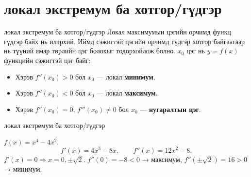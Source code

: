 \section{локал экстремум ба хотгор/гүдгэр}
\begin{frame}[allowframebreaks]{локал экстремум ба хотгор/гүдгэр}
Локал максимумын цэгийн орчимд функц гүдгэр байх нь илэрхий. Иймд сэжигтэй цэгийн орчимд гүдгэр хотгор байгаагаар нь түүний ямар төрлийн цэг болохыг тодорхойлож болно.  
$x_0$ цэг нь $y=f(x)$ функцийн сэжигтэй цэг байг:
\begin{itemize}
  \item Хэрэв $f''(x_0)>0$ бол $x_0$ — локал \textbf{минимум}.
  \item Хэрэв $f''(x_0)<0$ бол $x_0$ — локал \textbf{максимум}.
  \item Хэрэв $f''(x_0)=0$, $f'''(x_0)\ne0$ бол $x_0$ — \textbf{нугаралтын цэг}.
\end{itemize}
\end{frame}

\begin{frame}[allowframebreaks]{локал экстремум ба хотгор/гүдгэр}
\begin{example}
$f(x)=x^4-4x^2$.
\[
f'(x)=4x^3-8x,\qquad f''(x)=12x^2-8.
\]
$f'(x)=0\Rightarrow x=0,\pm\sqrt2$.  
$f''(0)=-8<0$ → максимум,  
$f''(\pm\sqrt2)=16>0$ → минимум.
\end{example}

\begin{center}
\begin{fitbox}\end{fitbox}
\end{center}
\end{frame}

